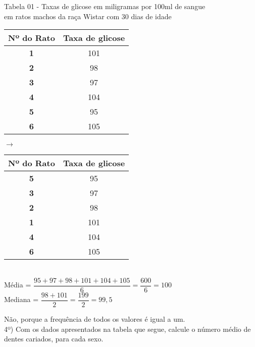 \documentclass[12pt,a4paper]{article}
\begin{document}
	\vspace{0.5cm}
	\begin{center}
		\small{Tabela 01 - Taxas de glicose em miligramas por 100ml de sangue\\
		em ratos machos da raça Wistar com 30 dias de idade\\}
		\begin{tabular}{|c|c|} \hline
			\textbf{Nº do Rato} & \textbf{Taxa de glicose}\\ \hline
			\textbf{1} & 101\\ \hline
			\textbf{2} & 98\\ \hline
			\textbf{3} & 97\\ \hline
			\textbf{4} & 104\\ \hline
			\textbf{5} & 95\\ \hline
			\textbf{6} & 105\\	\hline
		\end{tabular}
		\hspace{1cm}
		$\rightarrow$
		\hspace{1cm}
		\begin{tabular}{|c|c|} \hline
			\textbf{Nº do Rato} & \textbf{Taxa de glicose}\\ \hline
			\textbf{5} & 95\\ \hline
			\textbf{3} & 97\\ \hline
			\textbf{2} & 98\\ \hline
			\textbf{1} & 101\\ \hline
			\textbf{4} & 104\\ \hline
			\textbf{6} & 105\\	\hline
		\end{tabular}
		\vspace{1cm}\\
		Média = $\dfrac{95 + 97 + 98 + 101 + 104 + 105}{6} = \dfrac{600}{6} = 100$
		\vspace{0.5cm}\\
		Mediana = $\dfrac{98 + 101}{2} = \dfrac{199}{2} = 99,5$
	\end{center}
	\vspace{0.5cm}
	Não, porque a frequência de todos os valores é igual a um.
	\vspace{1cm}\\
	4º) Com os dados apresentados na tabela que segue, calcule o número médio de dentes cariados, para cada sexo.
\end{document}
